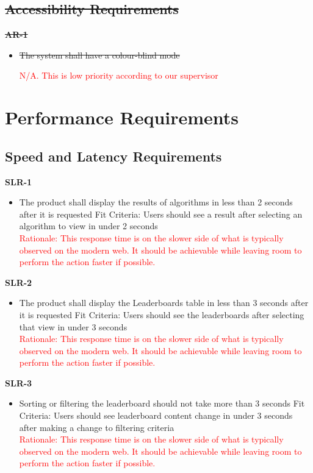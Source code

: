 \documentclass[12pt]{article}
\begin{document}
\subsection{\sout{Accessibility Requirements}}
\textbf{\sout{AR-1}}
\begin{itemize}
    \item \sout{The system shall have a colour-blind mode}

    \textcolor{red}{N/A. This is low priority according to our supervisor}
\end{itemize}

\section{Performance Requirements}
\subsection{Speed and Latency Requirements}
\textbf{SLR-1}
\begin{itemize}
\item The product shall display the results of algorithms in less than 2 seconds after it is requested \hfill \break
Fit Criteria: Users should see a result after selecting an algorithm to view in under 2 seconds \\
\textcolor{red} {Rationale: This response time is on the slower side of what is typically observed on the modern web. It should be achievable while leaving room to perform the action faster if possible.}
\end{itemize}
\textbf{SLR-2}
\begin{itemize}
\item The product shall display the Leaderboards table in less than 3 seconds after it is requested \hfill \break
Fit Criteria: Users should see the leaderboards after selecting that view in under 3 seconds \\
\textcolor{red} {Rationale: This response time is on the slower side of what is typically observed on the modern web. It should be achievable while leaving room to perform the action faster if possible.}
\end{itemize}
\textbf{SLR-3}
\begin{itemize}
\item Sorting or filtering the leaderboard should not take more than 3 seconds \hfill \break
Fit Criteria: Users should see leaderboard content change in under 3 seconds after making a change to filtering criteria \\
\textcolor{red} {Rationale: This response time is on the slower side of what is typically observed on the modern web. It should be achievable while leaving room to perform the action faster if possible.}
\end{itemize}
\end{document}
